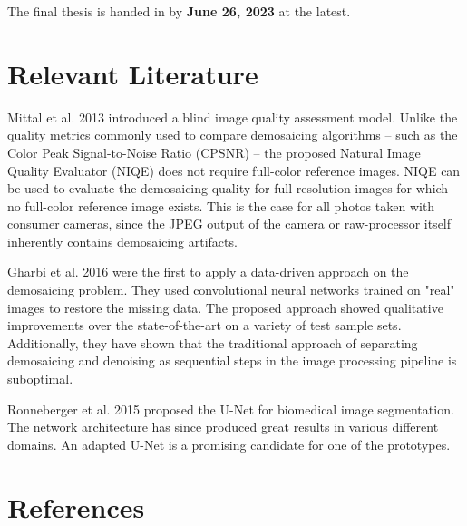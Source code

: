 \documentclass[english,notitlepage,smartquotes]{hgbreport}
\begin{document}
The final thesis is handed in by \textbf{June 26, 2023} at the latest.

\section{Relevant Literature}

Mittal et al. 2013 \cite{Mittal2013} introduced a blind image quality assessment model. Unlike the quality metrics commonly used to compare demosaicing algorithms -- such as the Color Peak Signal-to-Noise Ratio (CPSNR) \cite{Menon2011} -- the proposed Natural Image Quality Evaluator (NIQE) does not require full-color reference images. NIQE can be used to evaluate the demosaicing quality for full-resolution images for which no full-color reference image exists. This is the case for all photos taken with consumer cameras, since the JPEG output of the camera or raw-processor itself inherently contains demosaicing artifacts.

Gharbi et al. 2016 \cite{Gharbi2016} were the first to apply a data-driven approach on the demosaicing problem. They used convolutional neural networks trained on "real" images to restore the missing data. The proposed approach showed qualitative improvements over the state-of-the-art on a variety of test sample sets. Additionally, they have shown that the traditional approach of separating demosaicing and denoising as sequential steps in the image processing pipeline is suboptimal.

Ronneberger et al. 2015 \cite{Ronneberger2015} proposed the U-Net for biomedical image segmentation. The network architecture has since produced great results in various different domains. An adapted U-Net is a promising candidate for one of the prototypes.


  
\section*{References}

\printbibliography[heading=noheader]

\end{document}
